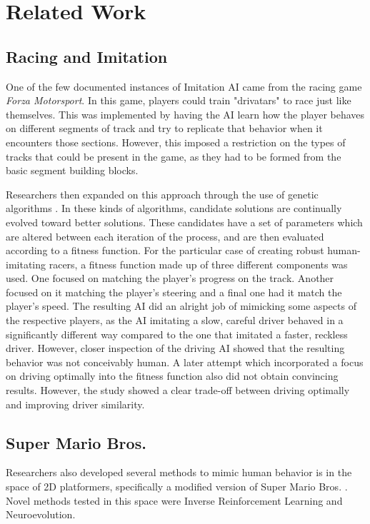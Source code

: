 \chapter{Related Work} %

\label{Chapter2} %

\section{Racing and Imitation}
One of the few documented instances of Imitation AI came from the racing game \textit{Forza Motorsport}. In this game, players could train "drivatars" to race just like themselves. This was implemented by having the AI learn how the player behaves on different segments of track and try to replicate that behavior when it encounters those sections. However, this imposed a restriction on the types of tracks that could be present in the game, as they had to be formed from the basic segment building blocks.

Researchers then expanded on this approach through the use of genetic algorithms \parencite{DrivingPlayerModeler}. In these kinds of algorithms, candidate solutions are continually evolved toward better solutions. These candidates have a set of parameters which are altered between each iteration of the process, and are then evaluated according to a fitness function. For the particular case of creating robust human-imitating racers, a fitness function made up of three different components was used. One focused on matching the player's progress on the track. Another focused on it matching the player's steering and a final one had it match the player's speed. The resulting AI did an alright job of mimicking some aspects of the respective players, as the AI imitating a slow, careful driver behaved in a significantly different way compared to the one that imitated a faster, reckless driver. However, closer inspection of the driving AI showed that the resulting behavior was not conceivably human. A later attempt which incorporated a focus on driving optimally into the fitness function also did not obtain convincing results. However, the study showed a clear trade-off between driving optimally and improving driver similarity. \parencite{MultiObjectiveMimic}

\section{Super Mario Bros.}
Researchers also developed several methods to mimic human behavior is in the space of 2D platformers, specifically a modified version of Super Mario Bros. \parencite{MarioImitation}. Novel methods tested in this space were Inverse Reinforcement Learning and Neuroevolution. 

